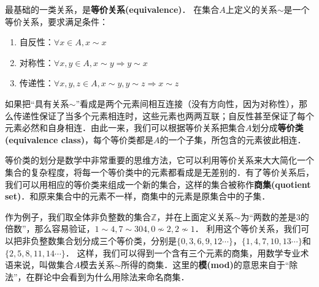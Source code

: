 最基础的一类关系，是\textbf{等价关系(equivalence)}． 在集合$A$上定义的关系$\sim$是一个等价关系，要求满足条件：
\begin{enumerate}
\item 自反性：$\forall x\in A, x\sim x$
\item 对称性：$\forall x, y\in A, x\sim y \Rightarrow y\sim x$
\item 传递性：$\forall x, y, z\in A, x\sim y, y\sim z\Rightarrow x\sim z$
\end{enumerate}
如果把“具有关系$\sim$”看成是两个元素间相互连接（没有方向性，因为对称性），那么传递性保证了当多个元素相连时，这些元素也两两互联；自反性甚至保证了每个元素必然和自身相连．由此一来，我们可以根据等价关系把集合$A$划分成\textbf{等价类(equivalence class)}，每个等价类都是$A$的一个子集，所包含的元素彼此相连．

等价类的划分是数学中非常重要的思维方法，它可以利用等价关系来大大简化一个集合的复杂程度，将每一个等价类中的元素都看成是无差别的．有了等价关系后，我们可以用相应的等价类来组成一个新的集合，这样的集合被称作\textbf{商集(quotient set)}．和原来集合中的元素不一样，商集中的元素是原集合中的子集．

作为例子，我们取全体非负整数的集合$\mathbb{Z}$，并在上面定义关系$\sim$为“两数的差是3的倍数”，那么容易验证，$1\sim4, 7\sim304, 0\not\sim 2, 2\not\sim 1$． 利用这个等价关系，我们可以把非负整数集合划分成三个等价类，分别是$\{0, 3, 6, 9, 12\cdots \}$，$\{1, 4, 7, 10, 13\cdots\}$和$\{2, 5, 8, 11, 14\cdots\}$． 这样，我们可以得到一个含有三个元素的商集，用数学专业术语来说，叫做集合$A$模去关系$\sim$所得的商集．这里的\textbf{模(mod)}的意思来自于“除法”，在群论中会看到为什么用除法来命名商集．


